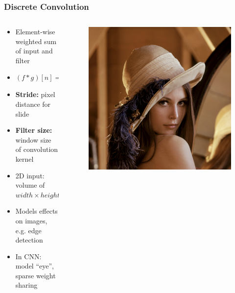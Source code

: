 \documentclass[aspectratio=1610]{beamer}
\begin{document}
\begin{frame}
\frametitle{Discrete Convolution}

\begin{columns}
    \begin{column}{0.58\textwidth}
        \begin{itemize}
            \item Element-wise weighted sum of input and filter
            \item $(f*g)[n]=\sum_{m=-\infty}^{\infty}f[m]g[n-m]$
            \item \textbf{Stride:} pixel distance for slide
            \item \textbf{Filter size:} window size of convolution kernel
            \item 2D input: volume of $width\times height(\times channels)$
            \item Models effects on images, e.g. edge detection
            \item In CNN: model ``eye'', sparse weight sharing
        \end{itemize}
    \end{column}
    \begin{column}{0.38\textwidth}
        \begin{figure}
            \centering
            \includegraphics[height=0.38\textheight]{lena.jpg}\\

\end{figure}
\end{column}
\end{columns}
\end{frame}
\end{document}
